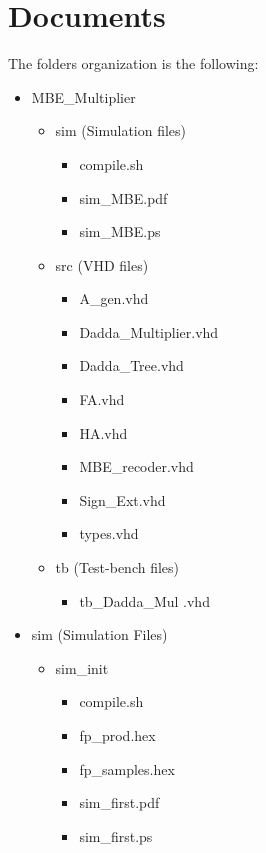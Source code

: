 \chapter{Documents}
\label{appendix1}

The folders organization is the following:\\
\begin{itemize}
    \item MBE\_Multiplier
    \begin{itemize}
        \item sim (Simulation files)
         \begin{itemize}
            \item compile.sh
            \item sim\_MBE.pdf
            \item sim\_MBE.ps
        \end{itemize}
        \item src (VHD files)
         \begin{itemize}
            \item A\_gen.vhd
            \item Dadda\_Multiplier.vhd
            \item Dadda\_Tree.vhd
            \item FA.vhd
            \item HA.vhd
            \item MBE\_recoder.vhd
            \item Sign\_Ext.vhd
            \item types.vhd
        \end{itemize}
        \item tb (Test-bench files)
         \begin{itemize}
            \item tb\_Dadda\_Mul .vhd
        \end{itemize}
    \end{itemize}
    \item sim (Simulation Files)
    \begin{itemize}
        \item sim\_init
         \begin{itemize}
            \item compile.sh
            \item fp\_prod.hex
            \item fp\_samples.hex
            \item sim\_first.pdf
            \item sim\_first.ps

\end{itemize}
\end{itemize}
\end{itemize}
